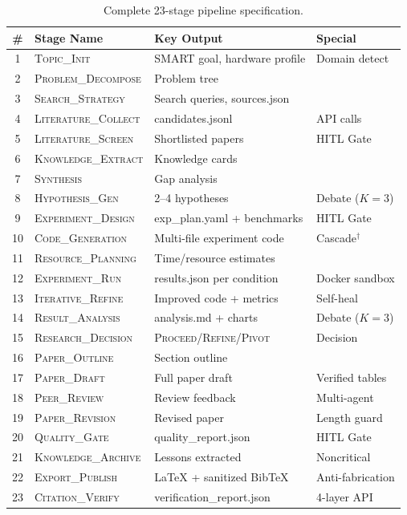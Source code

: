 \begin{table}[h]
\centering
\caption{Complete 23-stage pipeline specification.}
\label{tab:all_stages}
\small
\begin{tabular}{@{}c l l l@{}}
\toprule
\textbf{\#} & \textbf{Stage Name} & \textbf{Key Output} & \textbf{Special} \\
\midrule
1 & \textsc{Topic\_Init} & SMART goal, hardware profile & Domain detect \\
2 & \textsc{Problem\_Decompose} & Problem tree & \\
3 & \textsc{Search\_Strategy} & Search queries, sources.json & \\
4 & \textsc{Literature\_Collect} & candidates.jsonl & API calls \\
5 & \textsc{Literature\_Screen} & Shortlisted papers & HITL Gate \\
6 & \textsc{Knowledge\_Extract} & Knowledge cards & \\
7 & \textsc{Synthesis} & Gap analysis & \\
8 & \textsc{Hypothesis\_Gen} & 2--4 hypotheses & Debate ($K{=}3$) \\
9 & \textsc{Experiment\_Design} & exp\_plan.yaml + benchmarks & HITL Gate \\
10 & \textsc{Code\_Generation} & Multi-file experiment code & Cascade$^\dagger$ \\
11 & \textsc{Resource\_Planning} & Time/resource estimates & \\
12 & \textsc{Experiment\_Run} & results.json per condition & Docker sandbox \\
13 & \textsc{Iterative\_Refine} & Improved code + metrics & Self-heal \\
14 & \textsc{Result\_Analysis} & analysis.md + charts & Debate ($K{=}3$) \\
15 & \textsc{Research\_Decision} & \textsc{Proceed}/\textsc{Refine}/\textsc{Pivot} & Decision \\
16 & \textsc{Paper\_Outline} & Section outline & \\
17 & \textsc{Paper\_Draft} & Full paper draft & Verified tables \\
18 & \textsc{Peer\_Review} & Review feedback & Multi-agent \\
19 & \textsc{Paper\_Revision} & Revised paper & Length guard \\
20 & \textsc{Quality\_Gate} & quality\_report.json & HITL Gate \\
21 & \textsc{Knowledge\_Archive} & Lessons extracted & Noncritical \\
22 & \textsc{Export\_Publish} & \LaTeX{} + sanitized BibTeX & Anti-fabrication \\
23 & \textsc{Citation\_Verify} & verification\_report.json & 4-layer API \\
\bottomrule
\end{tabular}
\vspace{0.3em}

\end{table}

